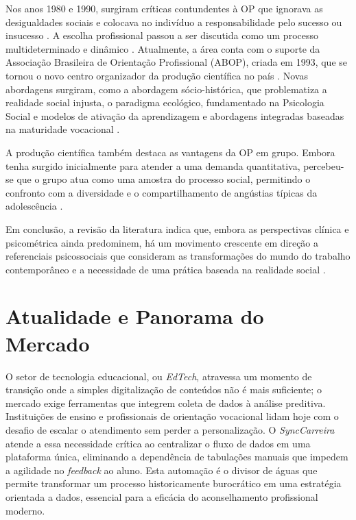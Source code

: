 Nos anos 1980 e 1990, surgiram críticas contundentes à OP que ignorava as desigualdades sociais e colocava no indivíduo a responsabilidade pelo sucesso ou insucesso \cite{abade2005}. A escolha profissional passou a ser discutida como um processo multideterminado e dinâmico \cite{abade2005}. Atualmente, a área conta com o suporte da Associação Brasileira de Orientação Profissional (ABOP), criada em 1993, que se tornou o novo centro organizador da produção científica no país \cite{abade2005}. Novas abordagens surgiram, como a abordagem sócio-histórica, que problematiza a realidade social injusta, o paradigma ecológico, fundamentado na Psicologia Social e modelos de ativação da aprendizagem e abordagens integradas baseadas na maturidade vocacional \cite{abade2005}.

A produção científica também destaca as vantagens da OP em grupo. Embora tenha surgido inicialmente para atender a uma demanda quantitativa, percebeu-se que o grupo atua como uma amostra do processo social, permitindo o confronto com a diversidade e o compartilhamento de angústias típicas da adolescência \cite{abade2005}.

Em conclusão, a revisão da literatura indica que, embora as perspectivas clínica e psicométrica ainda predominem, há um movimento crescente em direção a referenciais psicossociais que consideram as transformações do mundo do trabalho contemporâneo e a necessidade de uma prática baseada na realidade social \cite{abade2005}.

\section{Atualidade e Panorama do Mercado}

O setor de tecnologia educacional, ou \textit{EdTech}, atravessa um momento de transição onde a simples digitalização de conteúdos não é mais suficiente; o mercado exige ferramentas que integrem coleta de dados à análise preditiva. Instituições de ensino e profissionais de orientação vocacional lidam hoje com o desafio de escalar o atendimento sem perder a personalização. O \textit{SyncCarreira} atende a essa necessidade crítica ao centralizar o fluxo de dados em uma plataforma única, eliminando a dependência de tabulações manuais que impedem a agilidade no \textit{feedback} ao aluno. Esta automação é o divisor de águas que permite transformar um processo historicamente burocrático em uma estratégia orientada a dados, essencial para a eficácia do aconselhamento profissional moderno.

